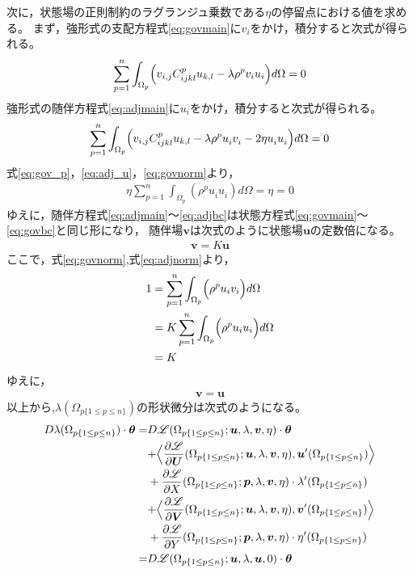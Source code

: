 次に，状態場の正則制約のラグランジュ乗数である$\eta$の停留点における値を求める。
まず，強形式の支配方程式\eqref{eq:govmain}に$v_i$をかけ，積分すると次式が得られる。
\begin{align}
	\sum_{p=1}^{n}\int_{\Omega_p}\Bigr(v_{i,j}C_{ijkl}^{p}u_{k,l}-\lambda\rho^{p}v_{i}u_{i}\Bigl) d\Omega=0
	\label{eq:gov_p}
\end{align}
強形式の随伴方程式\eqref{eq:adjmain}に$u_i$をかけ，積分すると次式が得られる。
\begin{align}
	\sum_{p=1}^{n}\int_{\Omega_p}\Bigr(v_{i,j}C_{ijkl}^{p}u_{k,l}-\lambda\rho^{p}u_{i}^{}v_{i}^{}-2\eta u_{i}^{}u_{i}^{}\Bigl) d\Omega=0
	\label{eq:adj_u}
\end{align}
式\eqref{eq:gov_p}，\eqref{eq:adj_u}，\eqref{eq:govnorm}より，
\begin{align}
	\eta\sum_{p=1}^{n}\int_{\Omega_p}(\rho^{p}u_{i}^{}u_{i}^{}) d\Omega=\eta=0
	\label{eq:yopt}
\end{align}
ゆえに，随伴方程式\eqref{eq:adjmain}～\eqref{eq:adjbc}は状態方程式\eqref{eq:govmain}～\eqref{eq:govbc}と同じ形になり，
随伴場$\bm{v}$は次式のように状態場$\bm{u}$の定数倍になる。
\begin{align}
	\bm{v}=K\bm{u}
	\label{eq:v_ku}
\end{align}
ここで，式\eqref{eq:govnorm},式\eqref{eq:adjnorm}より，
\begin{align}
	1&=\sum_{p=1}^{n}\int_{\Omega_p}\Bigr(\rho^{p}u_{i}v_{i}\Bigl) d\Omega
	\nonumber
	\\
	&=K\sum_{p=1}^{n}\int_{\Omega_p}\Bigr(\rho^{p}u_{i}u_{i}\Bigl) d\Omega
	\nonumber
	\\
	&=K
	\label{eq:k}
\end{align}
ゆえに，
\begin{align}
	\bm{v}=\bm{u}
	\label{eq:v_u}
\end{align}
以上から,$\lambda(\Omega_{p\{1\leq p\leq n\}})$の形状微分は次式のようになる。
\begin{align}
	D\lambda(\Omega_{p\{1\leq p\leq n\}})\cdot\bm{\theta}
	=&D\mathscr{L}(\Omega_{p\{1\leq p\leq n\}};\bm{u},\lambda,\bm{v},\eta)\cdot\bm{\theta}
	\nonumber
	\\
	&+\Bigr\langle \frac{\partial \mathscr{L}}{\partial \bm{U}}(\Omega_{p\{1\leq p\leq n\}};\bm{u},\lambda,\bm{v},\eta),
	\bm{u}'(\Omega_{p\{1\leq p\leq n\}}) \Bigl\rangle
	\nonumber
	\\
	&+\frac{\partial \mathscr{L}}{\partial X}(\Omega_{p\{1\leq p\leq n\}};\bm{p},\lambda,\bm{v},\eta)\cdot
	\lambda'(\Omega_{p\{1\leq p\leq n\}})
	\nonumber
	\\
	&+\Bigr\langle \frac{\partial \mathscr{L}}{\partial \bm{V}}(\Omega_{p\{1\leq p\leq n\}};\bm{u},\lambda,\bm{v},\eta),
	\bm{v}'(\Omega_{p\{1\leq p\leq n\}}) \Bigl\rangle
	\nonumber
	\\
	&+\frac{\partial \mathscr{L}}{\partial Y}(\Omega_{p\{1\leq p\leq n\}};\bm{p},\lambda,\bm{v},\eta)\cdot
	\eta'(\Omega_{p\{1\leq p\leq n\}})
	\nonumber
	\\
	=&D\mathscr{L}(\Omega_{p\{1\leq p\leq n\}};\bm{u},\lambda,\bm{u},0)\cdot\bm{\theta}
	\label{eq:shape_lambda_u}
\end{align}
